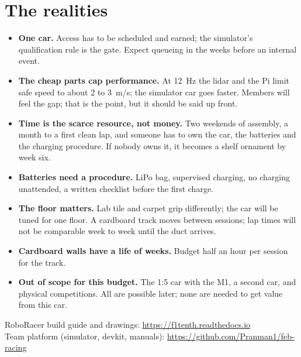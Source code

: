 \documentclass[11pt,a4paper]{article}
\begin{document}
\section{The realities}

\begin{itemize}
  \item \textbf{One car.} Access has to be scheduled and earned; the simulator's
  qualification rule is the gate. Expect queueing in the weeks before an internal event.
  \item \textbf{The cheap parts cap performance.} At 12~Hz the lidar and the Pi limit safe
  speed to about 2 to 3~m/s; the simulator car goes faster. Members will feel the gap; that is
  the point, but it should be said up front.
  \item \textbf{Time is the scarce resource, not money.} Two weekends of assembly, a month
  to a first clean lap, and someone has to own the car, the batteries and the charging
  procedure. If nobody owns it, it becomes a shelf ornament by week six.
  \item \textbf{Batteries need a procedure.} LiPo bag, supervised charging, no charging
  unattended, a written checklist before the first charge.
  \item \textbf{The floor matters.} Lab tile and carpet grip differently; the car will be
  tuned for one floor. A cardboard track moves between sessions; lap times will not be
  comparable week to week until the duct arrives.
  \item \textbf{Cardboard walls have a life of weeks.} Budget half an hour per session for
  the track.
  \item \textbf{Out of scope for this budget.} The 1:5 car with the M1, a second car, and
  physical competitions. All are possible later; none are needed to get value from this car.
\end{itemize}

\bigskip
\noindent RoboRacer build guide and drawings: \url{https://f1tenth.readthedocs.io}\\
Team platform (simulator, devkit, manuals): \url{https://github.com/Pranman1/feb-racing}
\end{document}
